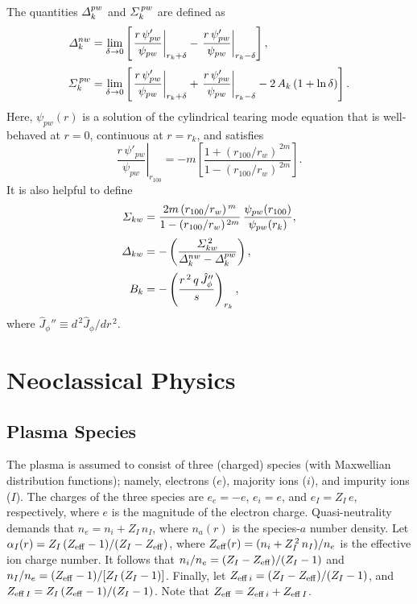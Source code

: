 \documentclass[notitlepage,12pt]{article}
\begin{document}
The quantities ${\mit\Delta}_k^{pw}$ and ${\mit\Sigma}_k^{\,pw}$
are defined as 
\begin{align}
{\mit\Delta}_k^{nw}&= \lim_{\delta\rightarrow 0}
\left[\left.\frac{r\,\psi'_{pw}}{\psi_{pw}}\right|_{r_k+\delta}
- \left.\frac{r\,\psi'_{pw}}{\psi_{pw}}\right|_{r_k-\delta}\right],\\[0.5ex]
{\mit\Sigma}_k^{\,pw} &= \lim_{\delta\rightarrow 0}\left[\left.\frac{r\,\psi'_{pw}}{\psi_{pw}}\right|_{r_k+\delta}+ \left.\frac{r\,\psi'_{pw}}{\psi_{pw}}\right|_{r_k-\delta}
-2\,A_k\,(1+\ln\delta)\right].
\end{align}
Here, $\psi_{pw}(r)$ is a solution of the cylindrical tearing mode equation that is well-behaved at $r=0$,
continuous at $r=r_k$, and satisfies 
\begin{equation}
\left.\frac{r\,\psi'_{pw}}{\psi_{pw}}\right|_{r_{100}} = -m\left[\frac{1+(r_{100}/r_w)^{\,2m}}{1-(r_{100}/r_w)^{\,2m}}\right].
\end{equation}
It is also helpful to define
\begin{align}
{\mit\Sigma}_{kw} &= \frac{2m\,(r_{100}/r_w)^{\,m}}{1-(r_{100}/r_w)^{\,2m}}\,\frac{\psi_{pw}(r_{100})}{\psi_{pw}(r_k)},\\[0.5ex]
{\mit\Delta}_{kw} &= -\left(\frac{{\mit\Sigma}_{kw}^{\,2}}{{\mit\Delta}^{nw}_k-{\mit\Delta}^{pw}_k}\right),\\[0.5ex]
B_k &= -\left(\frac{r^{\,2}\,q\,\hat{J}_\phi''}{s}\right)_{r_k},
\end{align}
where $\hat{J}_\phi'' \equiv d^{\,2}\hat{J}_\phi/dr^{\,2}$. 

\section{Neoclassical Physics}\label{appb}
\subsection{Plasma Species}\label{a3}
The plasma is assumed to consist of three (charged) species (with Maxwellian distribution functions); namely,  electrons ($e$), majority ions ($i$), and impurity ions
($I$).  The charges of the  three species are $e_e=-e$, $e_i= e$, and $e_I=Z_I\,e$, respectively, where
$e$ is the magnitude of the electron charge. 
Quasi-neutrality demands that
$n_e= n_i+ Z_I\,n_I$, where $n_a(r)$ is the species-$a$ number density. 
 Let 
$\alpha_I(r) =Z_I\,(Z_{\rm eff}-1)/(Z_I-Z_{\rm eff})$,
where 
$Z_{\rm eff}(r) = (n_i+Z_I^{\,2}\,n_I)/n_e$
is the effective ion charge number. It follows that
$n_i/n_e = (Z_I-Z_{\rm eff})/(Z_I-1)$
and
$n_I/n_e= (Z_{\rm eff}-1)/[Z_I\,(Z_I-1)]$. Finally, let $Z_{{\rm eff}\,i}= (Z_I-Z_{\rm eff})/(Z_I-1)$, and
$Z_{{\rm eff}\,I}=Z_I\,(Z_{\rm eff}-1)/(Z_I-1)$. Note that $Z_{\rm eff}= Z_{{\rm eff}\,i}+ Z_{{\rm eff}\,I}$. 
\end{document}
